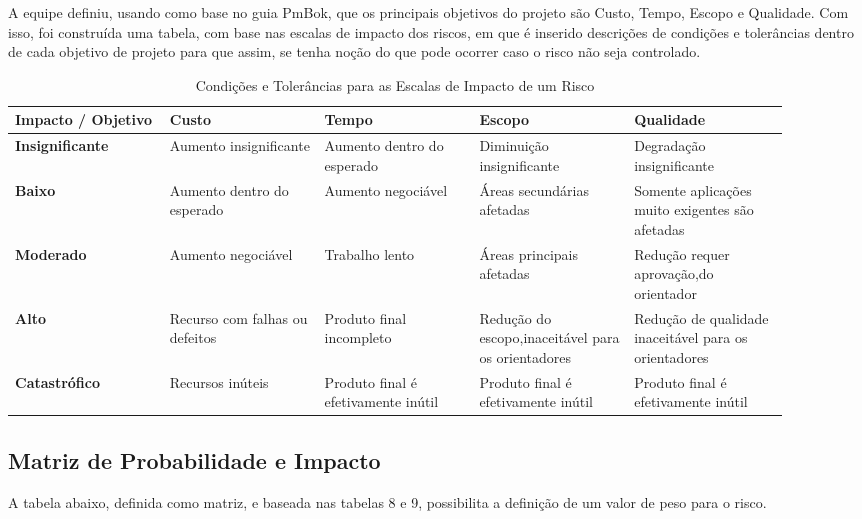 \begin{apendicesenv}
A equipe definiu, usando como base no guia PmBok, que os principais objetivos do projeto são Custo, Tempo, Escopo e Qualidade. Com isso, foi construída uma tabela, com base nas escalas de impacto dos riscos, em que é inserido descrições de condições e tolerâncias dentro de cada objetivo de projeto para que assim, se tenha noção do que pode ocorrer caso o risco não seja controlado.

\begin{table}[htp]
    \centering
    \caption{Condições e Tolerâncias para as Escalas de Impacto de um Risco}
    \label{my-label}
    \begin{tabular}{|p{0.18\linewidth}|p{0.18\linewidth}|p{0.18\linewidth}|p{0.18\linewidth}|p{0.18\linewidth}|}
    \hline
    \textbf{Impacto / Objetivo} & \textbf{Custo} & \textbf{Tempo} & \textbf{Escopo} & \textbf{Qualidade} \\ \hline
    \textbf{Insignificante} & Aumento insignificante & Aumento dentro do esperado & Diminuição insignificante & Degradação insignificante \\ \hline
    \textbf{Baixo} & Aumento dentro do esperado & Aumento negociável & Áreas secundárias afetadas & Somente aplicações muito exigentes são afetadas \\ \hline
    \textbf{Moderado} & Aumento negociável & Trabalho lento & Áreas principais afetadas & Redução requer aprovação,do orientador \\ \hline
    \textbf{Alto} & Recurso com falhas ou defeitos & Produto final incompleto & Redução do escopo,inaceitável para os orientadores & Redução de qualidade inaceitável para os orientadores \\ \hline
    \textbf{Catastrófico} & Recursos inúteis & Produto final é efetivamente inútil & Produto final é efetivamente inútil & Produto final é efetivamente inútil \\ \hline
    \end{tabular}
\end{table}

\subsection{Matriz de Probabilidade e Impacto}
A tabela abaixo, definida como matriz, e baseada nas tabelas 8 e 9, possibilita a definição de um valor de peso para o risco.


\end{apendicesenv}
